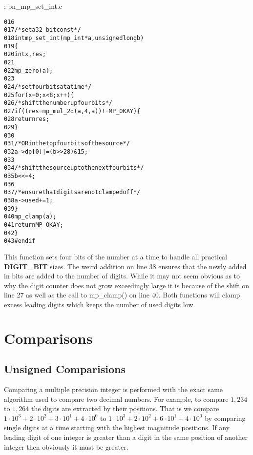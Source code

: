 \documentclass[b5paper]{book}
\begin{document}
\vspace{+3mm}\begin{small}
\hspace{-5.1mm}{\bf File}: bn\_mp\_set\_int.c
\vspace{-3mm}
\begin{alltt}
016   
017   /* set a 32-bit const */
018   int mp_set_int (mp_int * a, unsigned long b)
019   \{
020     int     x, res;
021   
022     mp_zero (a);
023     
024     /* set four bits at a time */
025     for (x = 0; x < 8; x++) \{
026       /* shift the number up four bits */
027       if ((res = mp_mul_2d (a, 4, a)) != MP_OKAY) \{
028         return res;
029       \}
030   
031       /* OR in the top four bits of the source */
032       a->dp[0] |= (b >> 28) & 15;
033   
034       /* shift the source up to the next four bits */
035       b <<= 4;
036   
037       /* ensure that digits are not clamped off */
038       a->used += 1;
039     \}
040     mp_clamp (a);
041     return MP_OKAY;
042   \}
043   #endif
\end{alltt}
\end{small}

This function sets four bits of the number at a time to handle all practical \textbf{DIGIT\_BIT} sizes.  The weird
addition on line 38 ensures that the newly added in bits are added to the number of digits.  While it may not 
seem obvious as to why the digit counter does not grow exceedingly large it is because of the shift on line 27 
as well as the  call to mp\_clamp() on line 40.  Both functions will clamp excess leading digits which keeps 
the number of used digits low.

\section{Comparisons}
\subsection{Unsigned Comparisions}
Comparing a multiple precision integer is performed with the exact same algorithm used to compare two decimal numbers.  For example,
to compare $1,234$ to $1,264$ the digits are extracted by their positions.  That is we compare $1 \cdot 10^3 + 2 \cdot 10^2 + 3 \cdot 10^1 + 4 \cdot 10^0$
to $1 \cdot 10^3 + 2 \cdot 10^2 + 6 \cdot 10^1 + 4 \cdot 10^0$ by comparing single digits at a time starting with the highest magnitude 
positions.  If any leading digit of one integer is greater than a digit in the same position of another integer then obviously it must be greater.  
\end{document}
